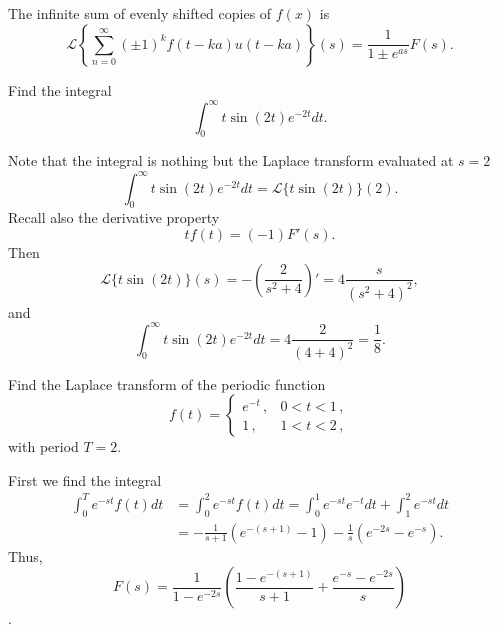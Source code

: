 \documentclass[11pt]{article}
\begin{document}
\begin{preamble}
\begin{formulaitem}
\item The infinite sum of evenly shifted copies of $f(x)$ is
\[\mathcal{L}\left\{\sum _{n=0}^{\infty}(\pm1)^{k}f(t-ka)u(t-ka)\right\}(s)=\frac{1}{1\pm e^{as}}F(s).\]

\end{formulaitem}
\end{preamble}


\begin{problem}
Find the integral
\[\int_{0}^{\infty}t\sin (2t) e^{-2t}dt.\]
\end{problem}
\begin{solution}
Note that the integral is nothing but the Laplace transform evaluated at $s=2$
\[\int_{0}^{\infty}t\sin (2t) e^{-2t}dt = \mathcal{L}\{t\sin (2t)\}(2).\]
Recall also the derivative property 
\[tf(t)=(-1)F'(s).\]
Then 
\[\mathcal{L}\{t\sin (2t)\}(s)=-\left( \frac{2}{s^{2}+4} \right)'=4 \frac{s}{(s^{2}+4)^{2}},\]
and 
\[\boxed{\int_{0}^{\infty}t\sin (2t) e^{-2t}dt=4 \frac{2}{(4+4)^{2}}=\frac{1}{8}.}\]
\end{solution}


\begin{problem}
Find the Laplace transform of the periodic function
\[f(t)=\left\{\begin{array}{ll}
        e^{-t}\,, & 0<t<1\,,\\
        1\,, & 1<t<2\,,
       \end{array}\right.
\]
with period $T=2$.
\end{problem}
\begin{solution}
First we find the integral
\begin{equation*}\begin{split}
\int_{0}^{T}e^{-st}f(t)dt & = \int_{0}^{2}e^{-st}f(t)dt=\int_{0}^{1}e^{-st}e^{-t}dt + \int_{1}^{2}e^{-st}dt \\ &=-\frac{1}{s+1}\left( e^{-(s+1)} -1 \right) - \frac{1}{s}\left( e^{-2s} - e^{-s} \right).\end{split}
\end{equation*}
Thus,
\[\boxed{F(s) = \frac{1}{1-e^{-2s}}\left( \frac{1-e^{-(s+1)}}{s+1} + \frac{e^{-s}-e^{-2s}}{s} \right)}\].
\end{solution}
\end{document}
